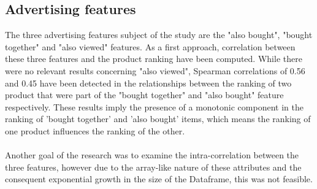 \documentclass[11pt]{article}
\begin{document}
\subsection{Advertising features}
  The three advertising features subject of the study are the "also bought", "bought together" and "also viewed" features. As a first approach, correlation between these three features and the product ranking have been computed. While there were no relevant results concerning "also viewed", Spearman correlations of 0.56 and 0.45 have been detected in the relationships between the ranking of two product that were part of the "bought together" and "also bought" feature respectively. These results imply the presence of a monotonic component in the ranking of 'bought together' and 'also bought' items, which means the ranking of one product influences the ranking of the other. \\\\
Another goal of the research was to examine the intra-correlation between the three features, however due to the array-like nature of these attributes and the consequent exponential growth in the size of the Dataframe, this was not feasible.
\end{document}
